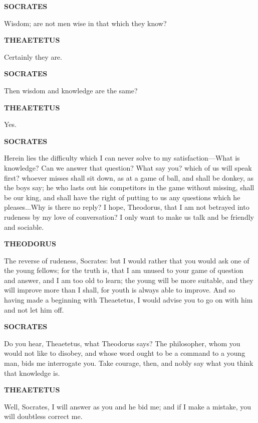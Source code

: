 \documentclass[11pt,letter]{article}
\begin{document}
\par \textbf{SOCRATES}
\par   Wisdom; are not men wise in that which they know?

\par \textbf{THEAETETUS}
\par   Certainly they are.

\par \textbf{SOCRATES}
\par   Then wisdom and knowledge are the same?

\par \textbf{THEAETETUS}
\par   Yes.

\par \textbf{SOCRATES}
\par   Herein lies the difficulty which I can never solve to my satisfaction—What is knowledge? Can we answer that question? What say you? which of us will speak first? whoever misses shall sit down, as at a game of ball, and shall be donkey, as the boys say; he who lasts out his competitors in the game without missing, shall be our king, and shall have the right of putting to us any questions which he pleases...Why is there no reply? I hope, Theodorus, that I am not betrayed into rudeness by my love of conversation? I only want to make us talk and be friendly and sociable.

\par \textbf{THEODORUS}
\par   The reverse of rudeness, Socrates:  but I would rather that you would ask one of the young fellows; for the truth is, that I am unused to your game of question and answer, and I am too old to learn; the young will be more suitable, and they will improve more than I shall, for youth is always able to improve. And so having made a beginning with Theaetetus, I would advise you to go on with him and not let him off.

\par \textbf{SOCRATES}
\par   Do you hear, Theaetetus, what Theodorus says? The philosopher, whom you would not like to disobey, and whose word ought to be a command to a young man, bids me interrogate you. Take courage, then, and nobly say what you think that knowledge is.

\par \textbf{THEAETETUS}
\par   Well, Socrates, I will answer as you and he bid me; and if I make a mistake, you will doubtless correct me.
\end{document}
